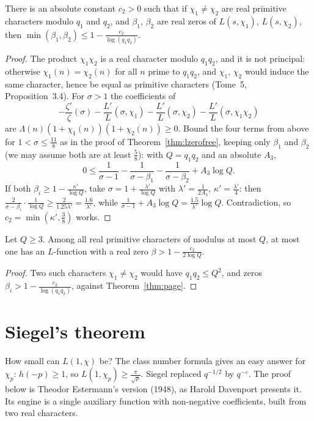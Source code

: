 \begin{theorem}\label{thm:page}
There is an absolute constant $c_2>0$ such that if $\chi_1\ne\chi_2$ are real primitive characters modulo $q_1$ and $q_2$, and $\beta_1$, $\beta_2$ are real zeros of $L(s,\chi_1)$, $L(s,\chi_2)$, then $\min(\beta_1,\beta_2)\le1-\frac{c_2}{\log(q_1q_2)}$.
\end{theorem}
\begin{proof}
The product $\chi_1\chi_2$ is a real character modulo $q_1q_2$, and it is not principal: otherwise $\chi_1(n)=\chi_2(n)$ for all $n$ prime to $q_1q_2$, and $\chi_1$, $\chi_2$ would induce the same character, hence be equal as primitive characters (Tome~5, Proposition~3.4). For $\sigma>1$ the coefficients of
\[
-\frac{\zeta'}\zeta(\sigma)-\frac{L'}L(\sigma,\chi_1)-\frac{L'}L(\sigma,\chi_2)-\frac{L'}L(\sigma,\chi_1\chi_2)
\]
are $\Lambda(n)(1+\chi_1(n))(1+\chi_2(n))\ge0$. Bound the four terms from above for $1<\sigma\le\frac{11}8$ as in the proof of Theorem~\ref{thm:lzerofree}, keeping only $\beta_1$ and $\beta_2$ (we may assume both are at least $\frac58$): with $Q=q_1q_2$ and an absolute $A_3$,
\[
0\le\frac1{\sigma-1}-\frac1{\sigma-\beta_1}-\frac1{\sigma-\beta_2}+A_3\log Q.
\]
If both $\beta_i\ge1-\frac{\kappa'}{\log Q}$, take $\sigma=1+\frac{\lambda'}{\log Q}$ with $\lambda'=\frac1{2A_3}$, $\kappa'=\frac{\lambda'}4$: then $\frac2{\sigma-\beta_i}\cdot\frac1{\log Q}\ge\frac2{1.25\lambda'}=\frac{1.6}{\lambda'}$, while $\frac1{\sigma-1}+A_3\log Q=\frac{1.5}{\lambda'}\log Q$. Contradiction, so $c_2=\min(\kappa',\frac38)$ works.
\end{proof}

\begin{corollary}[Page, 1935]\label{cor:page}
Let $Q\ge3$. Among all real primitive characters of modulus at most $Q$, at most one has an $L$-function with a real zero $\beta>1-\frac{c_2}{2\log Q}$.
\end{corollary}
\begin{proof}
Two such characters $\chi_1\ne\chi_2$ would have $q_1q_2\le Q^2$, and zeros $\beta_i>1-\frac{c_2}{\log(q_1q_2)}$, against Theorem~\ref{thm:page}.
\end{proof}

\section{Siegel's theorem}

How small can $L(1,\chi)$ be? The class number formula gives an easy answer for $\chi_p$: $h(-p)\ge1$, so $L(1,\chi_p)\ge\frac\pi{\sqrt p}$. Siegel replaced $q^{-1/2}$ by $q^{-\varepsilon}$. The proof below is Theodor Estermann's version (1948), as Harold Davenport presents it. Its engine is a single auxiliary function with non-negative
coefficients, built from two real characters.

